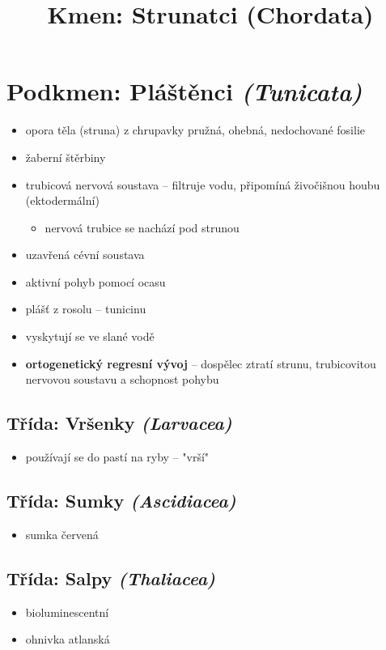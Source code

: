 \title{Kmen: Strunatci (Chordata)}


\section{Podkmen: Pláštěnci \textit{(Tunicata)}}
\begin{itemize}
\item opora těla (struna) z chrupavky \ra pružná, ohebná, nedochované fosilie
\item žaberní štěrbiny
\item trubicová nervová soustava -- filtruje vodu, připomíná živočišnou houbu (ektodermální)
\begin{itemize}
\item nervová trubice  se nachází pod strunou
\end{itemize}
\item uzavřená cévní soustava
\item aktivní pohyb pomocí ocasu
\item plášť z rosolu -- tunicinu
\item vyskytují se ve slané vodě
\item \textbf{ortogenetický regresní vývoj} -- dospělec ztratí strunu, trubicovitou nervovou soustavu a schopnost pohybu
\end{itemize}

\subsection{Třída: Vršenky \textit{(Larvacea)}}
\begin{itemize}
\item používají se do pastí na ryby -- "vrší"
\end{itemize}
\subsection{Třída: Sumky \textit{(Ascidiacea)}}
\begin{itemize}
\item sumka červená
\end{itemize}
\subsection{Třída: Salpy \textit{(Thaliacea)}}
\begin{itemize}
\item bioluminescentní
\item ohnivka atlanská
\end{itemize}


